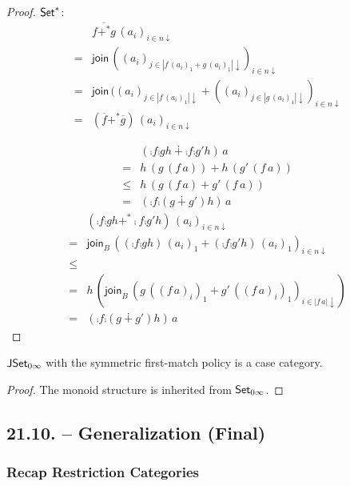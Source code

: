 \documentclass[runningheads,envcountsame]{llncs}
\begin{document}
\begin{proof}
    $\mathsf{Set}^*$: 
    \begin{align}
      & \overline{f +^* g}\,(a_i)_{i \in n\downarrow} \\
    = & \mathsf{join}\,((a_i)_{j \in |f\,(a_i)_1 + g\,(a_i)_1|\downarrow})_{i \in n\downarrow} \\
    = & \mathsf{join}\,((a_i)_{j \in |f\,(a_i)_1|\downarrow} + ((a_i)_{j \in |g\,(a_i)_1|\downarrow})_{i \in n\downarrow} \\
    = & (\overline{f} +^* \overline{g})\,(a_i)_{i \in n\downarrow}
    \end{align}
    
    \begin{align}
      & (\comp{f}{\comp{g}{h}} \dotplus \comp{f}{\comp{g'}{h}})\,a \\
    = & h\,(g\,(f\,a)) + h\,(g'\,(f\,a)) \\
    \leq & h\,(g\,(f\,a) + g'\,(f\,a)) \\
    = & (\comp{f}{\comp{(g \dotplus g')}{h}})\,a
    \end{align}
    \begin{align}
      & (\comp{f}{\comp{g}{h}} +^* \comp{f}{\comp{g'}{h}})\,(a_i)_{i \in n\downarrow} \\
    = & \mathsf{join}_B\,((\comp{f}{\comp{g}{h}})\,(a_i)_1 + (\comp{f}{\comp{g'}{h}})\,(a_i)_1)_{i\in n\downarrow} \\
    \leq &  \\
    = & h\,(\mathsf{join}_B\,(g\,((f\,a)_i)_1 + g'\,((f\,a)_i)_1)_{i\in |f\,a|\downarrow}) \\
    = & (\comp{f}{\comp{(g \dotplus g')}{h}})\,a
    \end{align}
\end{proof}
\begin{lemma}
    $\mathsf{J}\mathsf{Set}_{0\infty}$ with the symmetric first-match policy is a case category.
\end{lemma}
\begin{proof}
    The monoid structure is inherited from $\mathsf{Set}_{0\infty}$.
    
    
\end{proof}

\subsection{21.10. -- Generalization (Final)}

\subsubsection{Recap Restriction Categories}
\end{document}
